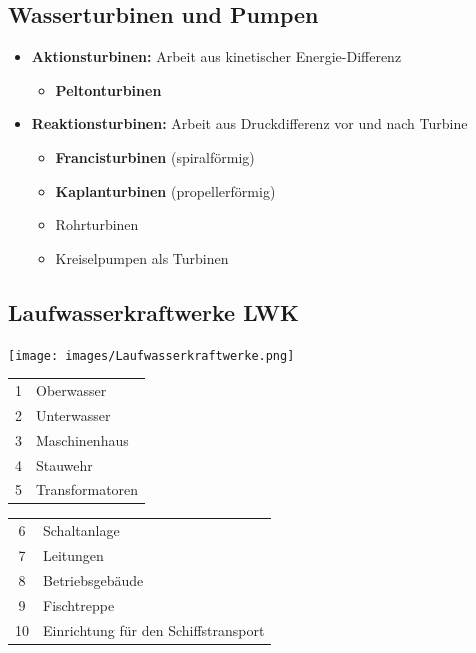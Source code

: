 \subsection{Wasserturbinen und Pumpen}

\begin{itemize}
    \item \textbf{Aktionsturbinen:} Arbeit aus kinetischer Energie-Differenz
    \begin{itemize}
        \item \textbf{Peltonturbinen}
    \end{itemize}

\item \textbf{Reaktionsturbinen:} Arbeit aus Druckdifferenz vor und nach Turbine
    \begin{itemize}
        \item \textbf{Francisturbinen} (spiralförmig)
        \item \textbf{Kaplanturbinen} (propellerförmig)
        \item Rohrturbinen
        \item Kreiselpumpen als Turbinen
    \end{itemize}
\end{itemize}



\subsection{Laufwasserkraftwerke LWK}

\begin{center}
    \texttt{[image: images/Laufwasserkraftwerke.png]}
\end{center}

\begin{minipage}[c]{0.38\columnwidth}
    \begin{tabular}{c l}
        1 & Oberwasser \\ 
        2 & Unterwasser \\ 
        3 & Maschinenhaus \\
        4 & Stauwehr \\
        5 & Transformatoren \\
    \end{tabular}
\end{minipage}
\hfill
\begin{minipage}[c]{0.58\columnwidth}
    \begin{tabular}{c l}
        6 & Schaltanlage \\
        7 & Leitungen \\
        8 & Betriebsgebäude \\
        9 & Fischtreppe \\
        10 & Einrichtung für den Schiffstransport \\
    \end{tabular}
\end{minipage}



